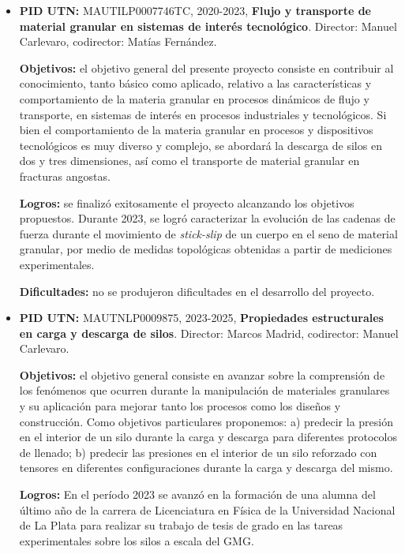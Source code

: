 \documentclass[a4paper,11pt,twoside,final,titlepage,onecolumn,openright]{report}
\begin{document}
\begin{itemize}
  
\item {\bf PID UTN:} MAUTILP0007746TC, 2020-2023, {\bf Flujo y transporte de material granular en sistemas de interés tecnológico}. Director: Manuel Carlevaro, codirector: Matías Fernández.
 
{\bf Objetivos:} el objetivo general del presente proyecto consiste en contribuir al conocimiento, tanto básico como aplicado, relativo a las características y comportamiento de la materia granular en procesos dinámicos de flujo y transporte, en sistemas de interés en procesos industriales y tecnológicos. Si bien el comportamiento de la materia granular en procesos y dispositivos tecnológicos es muy diverso y complejo, se abordará la descarga de silos en dos y tres dimensiones, así como el transporte de material granular en fracturas angostas.

 
{\bf Logros:} se finalizó exitosamente el proyecto alcanzando los objetivos propuestos. Durante 2023, se logró caracterizar la evolución de las cadenas de fuerza durante el movimiento de \textit{stick-slip} de un cuerpo en el seno de material granular, por medio de medidas topológicas obtenidas a partir de mediciones experimentales. 

 {\bf Dificultades:} no se produjeron dificultades en el desarrollo del proyecto. 
 
\item {\bf PID UTN:} MAUTNLP0009875, 2023-2025, {\bf Propiedades estructurales en carga y descarga de silos}. Director: Marcos Madrid, codirector: Manuel Carlevaro.
 
{\bf Objetivos:} el objetivo general consiste en avanzar sobre la comprensión de los fenómenos que ocurren durante la manipulación de materiales granulares y su aplicación para mejorar tanto los procesos como los diseños y construcción. Como objetivos particulares proponemos: a) predecir la presión en el interior de un silo durante la carga y descarga para diferentes protocolos de llenado; b) predecir las presiones en el interior de un silo reforzado con tensores en diferentes configuraciones durante la carga y descarga del mismo.

 {\bf Logros:} En el período 2023 se avanzó en la formación de una alumna del último año de la carrera de Licenciatura en Física de la Universidad Nacional de La Plata para realizar su trabajo de tesis de grado en las tareas experimentales sobre los silos a escala del GMG. 
 

\end{itemize}
\end{document}
